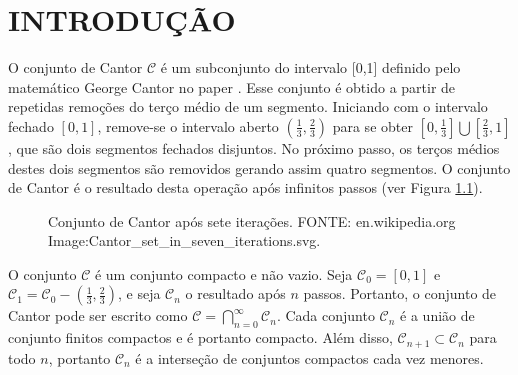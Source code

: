 
\chapter{INTRODUÇÃO}

O conjunto de Cantor $\mathcal{C}$ é um subconjunto do intervalo [0,1] definido pelo matemático George Cantor no paper . Esse conjunto é obtido a partir de repetidas remoções do terço médio de um segmento. Iniciando com o intervalo fechado $[0,1]$, remove-se o intervalo aberto $(\frac{1}{3},\frac{2}{3})$ para se obter $[0,\frac{1}{3}] \bigcup [\frac{2}{3}, 1]$, que são dois segmentos fechados disjuntos. No próximo passo, os terços médios destes dois segmentos são removidos gerando assim quatro segmentos. O conjunto de Cantor é o resultado desta operação após infinitos passos (ver Figura \ref{fig:fractal}).

\begin{figure}[ht!]
	\vspace{1mm}	%
	\begin{center}
	\end{center}
	\vspace{1mm}	%
	\caption{Conjunto de Cantor após sete iterações. FONTE: en.wikipedia.org Image:Cantor\_set\_in\_seven\_iterations.svg.}
	\label{fig:fractal}
\end{figure}

O conjunto $\mathcal{C}$ é um conjunto compacto e não vazio. Seja $\mathcal{C}_{0} = [0,1]$ e $\mathcal{C}_{1} = \mathcal{C}_{0}- (\frac{1}{3},\frac{2}{3})$, e seja $\mathcal{C}_{n}$ o resultado após $n$ passos. Portanto, o conjunto de Cantor pode ser escrito como $\mathcal{C} = \bigcap_{n=0}^{\infty} \mathcal{C}_{n}$. Cada conjunto $\mathcal{C}_{n}$ é a união de conjunto finitos compactos e é portanto compacto. Além disso, $\mathcal{C}_{n+1} \subset \mathcal{C}_{n}$ para todo $n$, portanto $\mathcal{C}_{n}$ é a interseção de conjuntos compactos cada vez menores.


